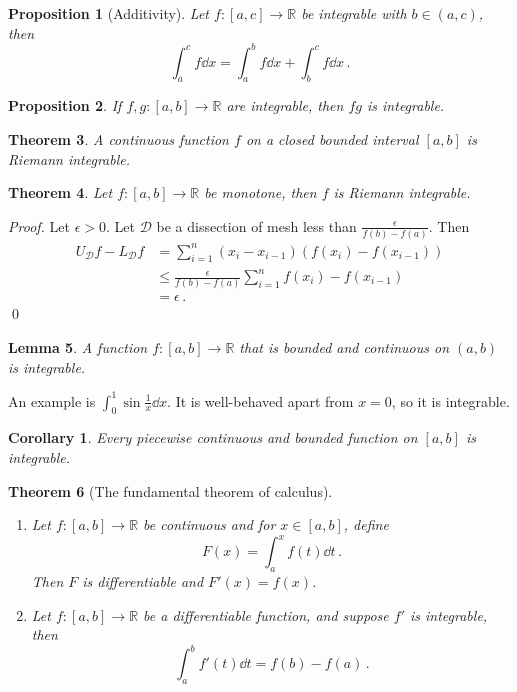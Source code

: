 \documentclass{article}
\theoremstyle{plain}\theoremheaderfont{\normalfont\itshape}\theorembodyfont{\rmfamily}\theoremseparator{.}\newtheorem*{rem}{Remark}\newtheorem*{ex}{Example}\newtheorem*{proof}{Proof}\newtheorem*{altp}{Alternative proof}
\theoremstyle{plain}\theoremheaderfont{\normalfont\bfseries}\theorembodyfont{\rmfamily}\theoremseparator{.}\newtheorem{thm}{Theorem}[section]\newtheorem{lem}[thm]{Lemma}\newtheorem{prop}[thm]{Proposition}\newtheorem*{cor}{Corollary}\newtheorem{defn}[thm]{Definition}\newtheorem{clm}[thm]{Claim}\newtheorem{clminproof}{Claim}
\theoremstyle{break}\theoremheaderfont{\normalfont\itshape}\theorembodyfont{\rmfamily}\theoremseparator{.\medskip}\newtheorem*{proofskip}{Proof}\newtheorem*{exs}{Examples}\newtheorem*{rems}{Remarks}
\theoremstyle{break}\theoremheaderfont{\normalfont\bfseries}\theorembodyfont{\rmfamily}\theoremseparator{.\medskip}\newtheorem{lemskip}[thm]{Lemma}\newtheorem{defnskip}[thm]{Definition}\newtheorem{propskip}[thm]{Proposition}\newtheorem{thmskip}[thm]{Theorem}
\newcommand{\qed}{\hfill\ensuremath{\Box}}
\begin{document}
    \begin{prop}[Additivity]
        Let \(f:[a,c]\to\mathbb{R}\) be integrable with \(b\in(a,c)\), then
        \[\int_{a}^{c}f\dd{x}=\int_{a}^{b}f\dd{x}+\int_{b}^{c}f\dd{x}\,.\]
    \end{prop}
    \begin{prop}
        If \(f,g:[a,b]\to\mathbb{R}\) are integrable, then \(fg\) is integrable.
    \end{prop}
    \begin{thm}
        A continuous function \(f\) on a closed bounded interval \([a,b]\) is Riemann integrable.
    \end{thm}
    \begin{thm}
        Let \(f:[a,b]\to\mathbb{R}\) be monotone, then \(f\) is Riemann integrable.
    \end{thm}
    \begin{proof}
        Let \(\epsilon>0\). Let \(\mathcal{D}\) be a dissection of mesh less than \(\frac{\epsilon}{f(b)-f(a)}\). Then
        \begin{align*}
            U_{\mathcal{D}}f-L_{\mathcal{D}}f&=\sum_{i=1}^{n}(x_i-x_{i-1})(f(x_i)-f(x_{i-1}))\\
            &\le\frac{\epsilon}{f(b)-f(a)}\sum_{i=1}^{n}f(x_i)-f(x_{i-1})\\
            &=\epsilon\,.
        \end{align*}\qed
    \end{proof}
    \begin{lem}
        A function \(f:[a,b]\to\mathbb{R}\) that is bounded and continuous on \((a,b)\) is integrable.
    \end{lem}
    An example is \(\int_{0}^{1}\sin\frac{1}{x}\dd{x}\). It is well-behaved apart from \(x=0\), so it is integrable.
    \begin{cor}
        Every piecewise continuous and bounded function on \([a,b]\) is integrable.
    \end{cor}
    \begin{thmskip}[The fundamental theorem of calculus]
        \begin{enumerate}[label=(\roman*)]
            \item Let \(f:[a,b]\to\mathbb{R}\) be continuous and for \(x\in[a,b]\), define
            \[F(x)=\int_{a}^{x}f(t)\dd{t}\,.\]
            Then \(F\) is differentiable and \(F'(x)=f(x)\).
            \item Let \(f:[a,b]\to\mathbb{R}\) be a differentiable function, and suppose \(f'\) is integrable, then
            \[\int_{a}^{b}f'(t)\dd{t}=f(b)-f(a)\,.\]
        \end{enumerate}
    \end{thmskip}
\end{document}
